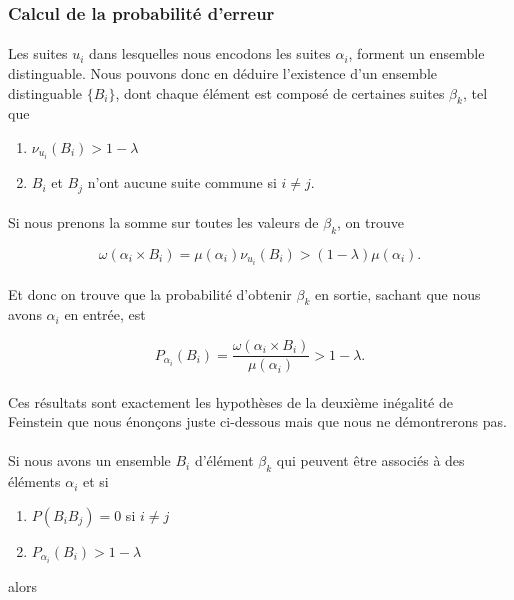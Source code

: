 \subsubsection*{Calcul de la probabilité d'erreur}
	
	\paragraph{}
	Les suites $u_i$ dans lesquelles nous encodons les suites $\alpha_i$,
	forment un ensemble distinguable. Nous pouvons donc en déduire l'existence
	d'un ensemble distinguable $\{B_i\}$, dont chaque élément est composé de 
	certaines suites $\beta_k$, tel que 
	\begin{enumerate}
		\item $\nu_{u_i}(B_i) > 1-\lambda$
		\item $B_i$ et $B_j$ n'ont aucune suite commune si $i\neq j$.
	\end{enumerate}
	
	\paragraph{}Si nous prenons la somme sur toutes les valeurs de $\beta_k$,
	on trouve
	
	\[
		\omega(\alpha_i \times B_i)=
		\mu(\alpha_i)\nu_{u_i}(B_i)>(1-\lambda)\mu(\alpha_i).
	\]
	
	\paragraph{}
	Et donc on trouve que la probabilité d'obtenir $\beta_k$ en sortie,
	sachant que nous avons $\alpha_i$ en entrée, est
	
	\[
		P_{\alpha_i}(B_i)=
		\frac{\omega(\alpha_i \times B_i)}{\mu(\alpha_i)}>1-\lambda.
	\]
	
	\paragraph{}
	Ces résultats sont exactement les hypothèses de la deuxième inégalité 
	de Feinstein que nous énonçons juste ci-dessous mais que nous ne 
	démontrerons pas.
	
	\paragraph{}
	Si nous avons un ensemble $B_i$ d'élément $\beta_k$ qui peuvent être
	associés à des éléments $\alpha_i$ et si 
	\begin{enumerate}
		\item $P(B_iB_j)=0$ si $i\neq j$
		\item $P_{\alpha_i}(B_i)>1-\lambda$
	\end{enumerate}
	alors 
	
